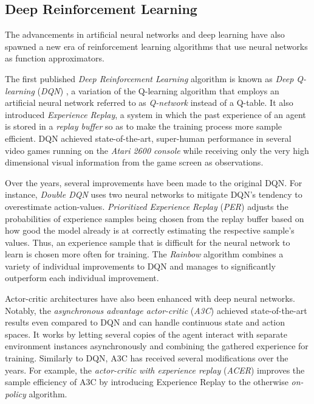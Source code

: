 \subsection{Deep Reinforcement Learning}
The advancements in artificial neural networks and deep learning have also spawned a new era of reinforcement learning algorithms that use neural networks as function approximators.

The first published \textit{Deep Reinforcement Learning} algorithm is known as \textit{Deep Q-learning} (\textit{DQN}) \cite{dqn}, a variation of the Q-learning algorithm that employs an artificial neural network referred to as \textit{Q-network} instead of a Q-table. It also introduced \textit{Experience Replay}, a system in which the past experience of an agent is stored in a \textit{replay buffer} so as to make the training process more sample efficient. DQN achieved state-of-the-art, super-human performance in several video games running on the \textit{Atari 2600 console} while receiving only the very high dimensional visual information from the game screen as observations.

Over the years, several improvements have been made to the original DQN. For instance, \textit{Double DQN} \cite{double-dqn} uses two neural networks to mitigate DQN's tendency to overestimate action-values. \textit{Prioritized Experience Replay} (\textit{PER}) \cite{per} adjusts the probabilities of experience samples being chosen from the replay buffer based on how good the model already is at correctly estimating the respective sample's values. Thus, an experience sample that is difficult for the neural network to learn is chosen more often for training. The \textit{Rainbow} algorithm \cite{rainbow} combines a variety of individual improvements to DQN and manages to significantly outperform each individual improvement.

Actor-critic architectures have also been enhanced with deep neural networks. Notably, the \textit{asynchronous advantage actor-critic} (\textit{A3C}) \cite{a3c} achieved state-of-the-art results even compared to DQN and can handle continuous state and action spaces. It works by letting several copies of the agent interact with separate environment instances asynchronously and combining the gathered experience for training. Similarly to DQN, A3C has received several modifications over the years. For example, the \textit{actor-critic with experience replay} (\textit{ACER}) \cite{acer} improves the sample efficiency of A3C by introducing Experience Replay to the otherwise \textit{on-policy} \cite{bible} algorithm.

